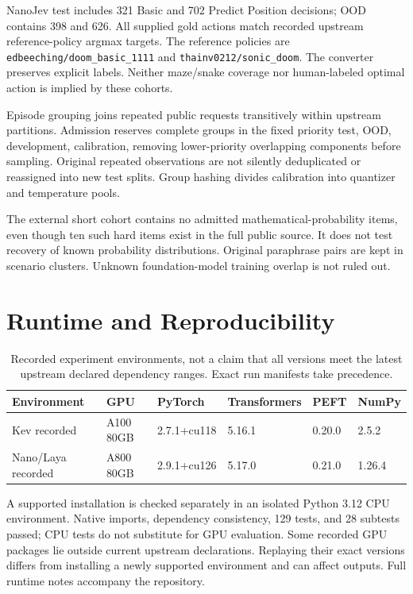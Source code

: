 \documentclass[10pt,twocolumn]{article}
\begin{document}
NanoJev test includes 321 Basic and 702 Predict Position
decisions; OOD contains 398 and 626. All supplied gold
actions match recorded upstream reference-policy argmax targets.
The reference policies are \texttt{edbeeching/doom\_basic\_1111}
and \texttt{thainv0212/sonic\_doom}. The converter preserves explicit
labels. Neither maze/snake coverage nor human-labeled optimal action
is implied by these cohorts.

Episode grouping joins repeated public requests transitively within
upstream partitions. Admission reserves complete groups in the fixed
priority test, OOD, development, calibration, removing lower-priority
overlapping components before sampling. Original repeated observations
are not silently deduplicated or reassigned into new test splits.
Group hashing divides calibration into quantizer and temperature pools.

The external short cohort contains no admitted mathematical-probability
items, even though ten such hard items exist in the full public source.
It does not test recovery of known probability distributions.
Original paraphrase pairs are kept in scenario clusters.
Unknown foundation-model training overlap is not ruled out.

\section{Runtime and Reproducibility}
\label{app:runtime}
\begin{table}[t]
\centering\small
\begin{tabular}{llllll}
\toprule
Environment & GPU & PyTorch & Transformers & PEFT & NumPy\\
\midrule
Kev recorded & A100 80GB & 2.7.1+cu118 & 5.16.1 & 0.20.0 & 2.5.2\\
Nano/Laya recorded & A800 80GB & 2.9.1+cu126 & 5.17.0 & 0.21.0 & 1.26.4\\
\bottomrule
\end{tabular}
\caption{Recorded experiment environments, not a claim that all
versions meet the latest upstream declared dependency ranges.
Exact run manifests take precedence.}
\end{table}

A supported installation is checked separately in an isolated Python
3.12 CPU environment. Native imports, dependency consistency,
129 tests, and 28 subtests passed; CPU tests do not substitute for
GPU evaluation. Some recorded GPU packages lie outside current
upstream declarations. Replaying their exact versions differs from
installing a newly supported environment and can affect outputs.
Full runtime notes accompany the repository.
\end{document}
